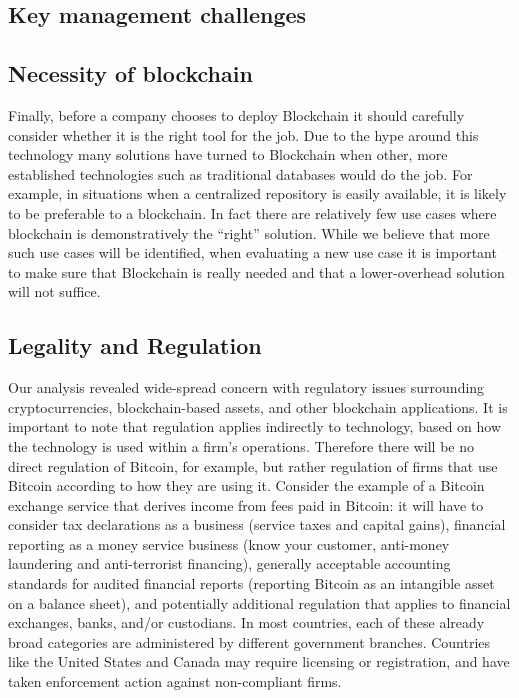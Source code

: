 \subsection{Key management challenges}

\subsection{Necessity of blockchain}
Finally, before a company chooses to deploy Blockchain it should carefully consider whether it is the right tool for the job.  Due to the hype around this technology many solutions have turned to Blockchain when other, more established technologies such as traditional databases would do the job. For example, in situations when a centralized repository is easily available, it is likely to be preferable to a blockchain.  In fact there are relatively few use cases where blockchain is demonstratively the ``right'' solution.  While we believe that more such use cases will be identified, when evaluating a new use case it is important to make sure that Blockchain is really needed and that a lower-overhead solution will not suffice.


\subsection{Legality and Regulation}

Our analysis revealed wide-spread concern with regulatory issues surrounding cryptocurrencies, blockchain-based assets, and other blockchain applications. It is important to note that regulation applies indirectly to technology, based on how the technology is used within a firm's operations. Therefore there will be no direct regulation of Bitcoin, for example, but rather regulation of firms that use Bitcoin according to how they are using it. Consider the example of a Bitcoin exchange service that derives income from fees paid in Bitcoin: it will have to consider tax declarations as a business (\eg service taxes and capital gains), financial reporting as a money service business (\eg know your customer, anti-money laundering and anti-terrorist financing), generally acceptable accounting standards for audited financial reports (\eg reporting Bitcoin as an intangible asset on a balance sheet), and potentially additional regulation that applies to financial exchanges, banks, and/or custodians. In most countries, each of these already broad categories are administered by different government branches. Countries like the United States and Canada may require licensing or registration, and have taken enforcement action against non-compliant firms.

